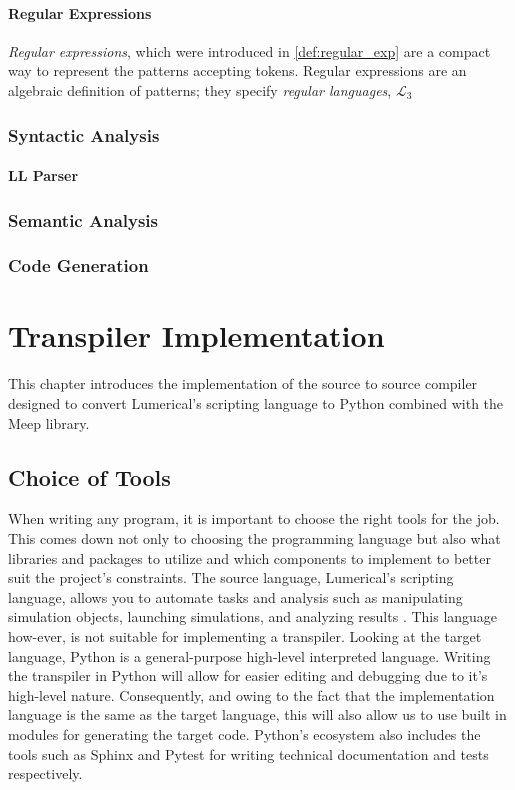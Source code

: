 

\subsubsection*{Regular Expressions}
\emph{Regular expressions}, which were introduced in \cref{def:regular_exp} are a compact way to represent the patterns accepting tokens. Regular expressions are an algebraic definition of patterns; they specify \emph{regular languages}, $\mathcal{L}_3$

\subsection*{Syntactic Analysis}

\subsubsection*{LL Parser}

\subsection*{Semantic Analysis}

\subsection*{Code Generation}


\chapter{Transpiler Implementation}
This chapter introduces the implementation of the source to source compiler designed to convert Lumerical's scripting language to Python combined with the Meep library. 
\section{Choice of Tools}
When writing any program, it is important to choose the right tools for the job. This comes down not only to choosing the programming language but also what libraries and packages to utilize and which components to implement to better suit the project's constraints. The source language, Lumerical's scripting language, allows you to automate tasks and analysis such as manipulating simulation objects, launching simulations, and analyzing results \cite{ansys_lsf}. This language how-ever, is not suitable for implementing a transpiler. Looking at the target language, Python is a general-purpose high-level interpreted language. Writing the transpiler in Python will allow for easier editing and debugging due to it's high-level nature. Consequently, and owing to the fact that the implementation language is the same as the target language, this will also allow us to use built in modules for generating the target code. Python's ecosystem also includes the tools such as Sphinx and Pytest for writing technical documentation and tests respectively.

